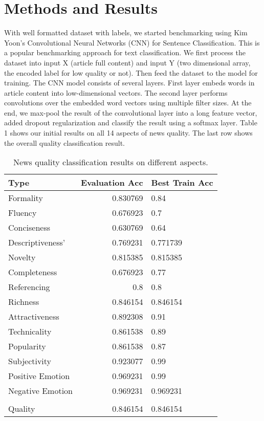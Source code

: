 \documentclass[11pt]{article}
\begin{document}
\section{Methods and Results}

With well formatted dataset with labels, we started benchmarking using Kim Yoon’s Convolutional Neural Networks (CNN) for Sentence Classification. This is a popular benchmarking approach for text classification. We first process the dataset into input X (article full content) and input Y (two dimensional array, the encoded label for low quality or not). Then feed the dataset to the model for training. The CNN model consists of several layers. First layer embeds words in article content into low-dimensional vectors. The second layer performs convolutions over the embedded word vectors using multiple filter sizes. At the end, we max-pool the result of the convolutional layer into a long feature vector, added dropout regularization and classify the result using a softmax layer.  Table 1 shows our initial results on all 14 aspects of news quality. The last row shows the overall quality classification result. 


\begin{table}[h]
\begin{center}
\begin{tabular}{|l|rl|}
\hline \bf Type & \bf Evaluation Acc & \bf Best Train Acc \\ \hline
Formality & 0.830769 & 0.84 \\
Fluency & 0.676923 & 0.7 \\
Conciseness & 0.630769 & 0.64 \\
Descriptiveness' & 0.769231 & 0.771739 \\
Novelty& 0.815385 & 0.815385 \\
Completeness & 0.676923  & 0.77\\
Referencing & 0.8 & 0.8 \\
Richness & 0.846154 & 0.846154 \\
Attractiveness & 0.892308 & 0.91 \\
Technicality & 0.861538 & 0.89 \\
Popularity & 0.861538 & 0.87 \\
Subjectivity & 0.923077 & 0.99 \\
Positive Emotion & 0.969231 & 0.99 \\
Negative Emotion & 0.969231 & 0.969231 \\
 &  &  \\
Quality & 0.846154 & 0.846154 \\
\hline
\end{tabular}
\end{center}
\caption{\label{font-table} News quality classification results on different aspects. }
\end{table}
\end{document}
